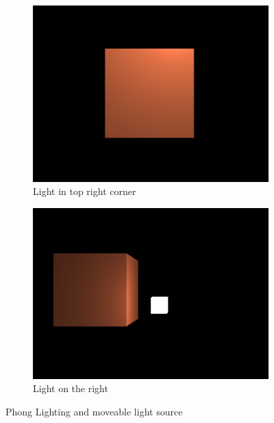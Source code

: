 \documentclass[12pt]{article}
\begin{document}
    \begin{figure}[H]
        \centering
        \begin{subfigure}[b]{0.45\textwidth}
            \centering
            \includegraphics[width=\textwidth]{phongLighting1.png}
            \caption{Light in top right corner}
        \end{subfigure}
        \hfill
        \begin{subfigure}[b]{0.45\textwidth}
            \centering
            \includegraphics[width=\textwidth]{phongLighting2.png}
            \caption{Light on the right}
        \end{subfigure}
        \caption{Phong Lighting and moveable light source}
    \end{figure}
\end{document}
